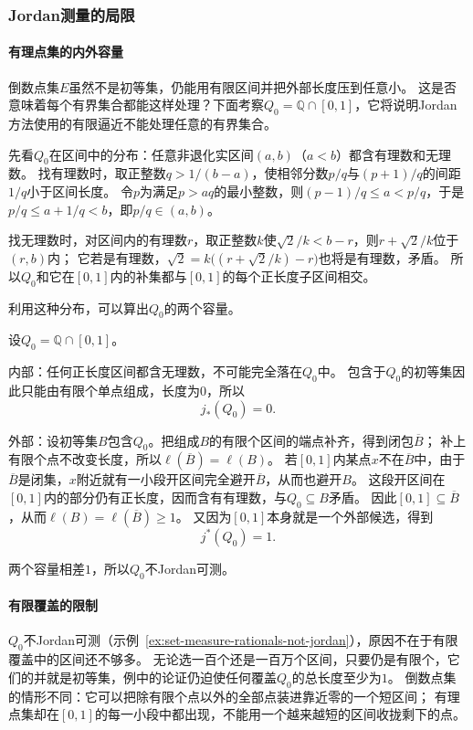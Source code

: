 \subsubsection{Jordan测量的局限}

\paragraph{有理点集的内外容量}

倒数点集$E$虽然不是初等集，仍能用有限区间并把外部长度压到任意小。
这是否意味着每个有界集合都能这样处理？下面考察$Q_0=\mathbb Q\cap[0,1]$，它将说明Jordan方法使用的有限逼近不能处理任意的有界集合。

先看$Q_0$在区间中的分布：任意非退化实区间$(a,b)$（$a<b$）都含有理数和无理数。
找有理数时，取正整数$q>1/(b-a)$，使相邻分数$p/q$与$(p+1)/q$的间距$1/q$小于区间长度。
令$p$为满足$p>aq$的最小整数，则$(p-1)/q\leq a<p/q$，于是$p/q\leq a+1/q<b$，即$p/q\in(a,b)$。

找无理数时，对区间内的有理数$r$，取正整数$k$使$\sqrt2/k<b-r$，则$r+\sqrt2/k$位于$(r,b)$内；
它若是有理数，$\sqrt2=k\bigl((r+\sqrt2/k)-r\bigr)$也将是有理数，矛盾。
所以$Q_0$和它在$[0,1]$内的补集都与$[0,1]$的每个正长度子区间相交。

利用这种分布，可以算出$Q_0$的两个容量。
\begin{example}[有理点集不Jordan可测]
\label{ex:set-measure-rationals-not-jordan}
设$Q_0=\mathbb Q\cap[0,1]$。

内部：任何正长度区间都含无理数，不可能完全落在$Q_0$中。
包含于$Q_0$的初等集因此只能由有限个单点组成，长度为$0$，所以
\[
 j_*(Q_0)=0.
\]

外部：设初等集$B$包含$Q_0$。把组成$B$的有限个区间的端点补齐，得到闭包$\overline B$；
补上有限个点不改变长度，所以$\ell(\overline B)=\ell(B)$。
若$[0,1]$内某点$x$不在$\overline B$中，由于$\overline B$是闭集，$x$附近就有一小段开区间完全避开$\overline B$，从而也避开$B$。
这段开区间在$[0,1]$内的部分仍有正长度，因而含有有理数，与$Q_0\subseteq B$矛盾。
因此$[0,1]\subseteq\overline B$，从而$\ell(B)=\ell(\overline B)\geq1$。
又因为$[0,1]$本身就是一个外部候选，得到
\[
 j^*(Q_0)=1.
\]

两个容量相差$1$，所以$Q_0$不Jordan可测。
\end{example}

\paragraph{有限覆盖的限制}

$Q_0$不Jordan可测（示例~\ref{ex:set-measure-rationals-not-jordan}），原因不在于有限覆盖中的区间还不够多。
无论选一百个还是一百万个区间，只要仍是有限个，它们的并就是初等集，例中的论证仍迫使任何覆盖$Q_0$的总长度至少为$1$。
倒数点集的情形不同：它可以把除有限个点以外的全部点装进靠近零的一个短区间；
有理点集却在$[0,1]$的每一小段中都出现，不能用一个越来越短的区间收拢剩下的点。

